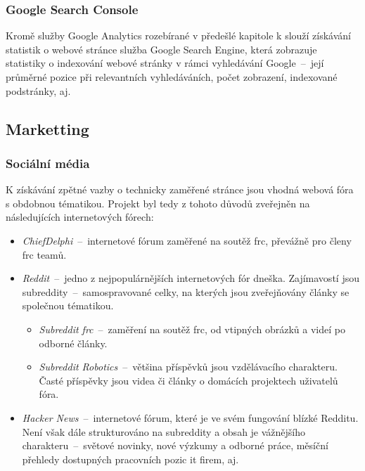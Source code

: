 \documentclass[a4paper, 12pt]{article}
\begin{document}


  \subsubsection{Google Search Console}
  Kromě služby Google Analytics rozebírané v předešlé kapitole k slouží získávání statistik o webové stránce služba Google Search Engine, která zobrazuje statistiky o indexování webové stránky v rámci vyhledávání Google~--~její průměrné pozice při relevantních vyhledáváních, počet zobrazení, indexované podstránky, aj.


  \subsection{Marketting}

  \subsubsection{Sociální média}
  K získávání zpětné vazby o technicky zaměřené stránce jsou vhodná webová fóra s obdobnou tématikou. Projekt byl tedy z tohoto důvodů zveřejněn na následujících internetových fórech:

  {\parskip=0pt
  \begin{itemize}[topsep=\itemsep]
    \item \emph{ChiefDelphi}~--~internetové fórum zaměřené na soutěž \gls{frc}, převážně pro členy \gls{frc} teamů.
    \item \emph{Reddit}~--~jedno z nejpopulárnějších internetových fór dneška. Zajímavostí jsou subreddity~--~samospravované celky, na kterých jsou zveřejňovány články se společnou tématikou.
    \begin{itemize}[topsep=0pt]
      \item \emph{Subreddit \gls{frc}}~--~zaměření na soutěž \gls{frc}, od vtipných obrázků a videí po odborné články.
      \item \emph{Subreddit Robotics}~--~většina příspěvků jsou vzdělávacího charakteru. Časté příspěvky jsou videa či články o domácích projektech uživatelů fóra.
    \end{itemize}
    \item \emph{Hacker News}~--~internetové fórum, které je ve svém fungování blízké Redditu. Není však dále strukturováno na subreddity a obsah je vážnějšího charakteru~--~světové novinky, nové výzkumy a odborné práce, měsíční přehledy dostupných pracovních pozic \gls{it} firem, aj.
  \end{itemize}}
\end{document}
